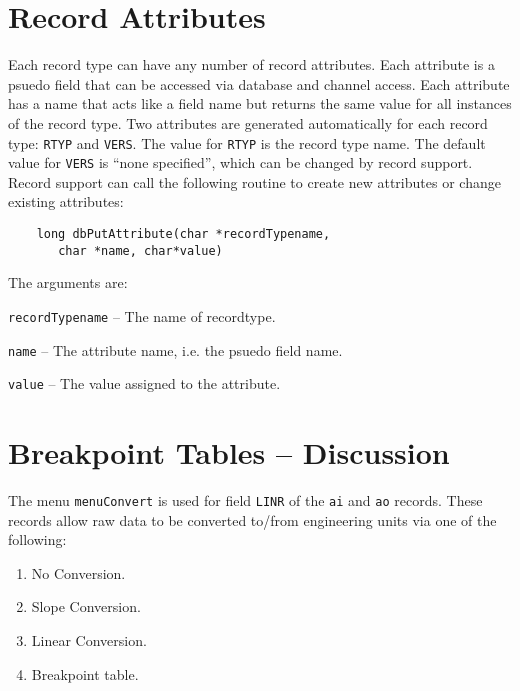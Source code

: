 \section{Record Attributes}

Each record type can have any number of record attributes.
Each attribute is a psuedo field that can be accessed via database and channel access.
Each attribute has a name that acts like a field name but returns the same value for all instances of the record type.
Two attributes are generated automatically for each record type: \verb|RTYP| and \verb|VERS|.
The value for \verb|RTYP| is the record type name.
The default value for \verb|VERS| is ``none specified'', which can be changed by record support.
Record support can call the following routine to create new attributes or change existing attributes:

\begin{verbatim}
    long dbPutAttribute(char *recordTypename,
       char *name, char*value)
\end{verbatim}

The arguments are:

\begin{description}
\item \verb|recordTypename| -- The name of recordtype.
\item \verb|name| -- The attribute name, i.e. the psuedo field name.
\item \verb|value| -- The value assigned to the attribute.
\end{description}

\section{Breakpoint Tables -- Discussion}

The menu \verb|menuConvert| is used for field \verb|LINR| of the \verb|ai| and \verb|ao| records.
These records allow raw data to be converted to/from engineering units via one of the following:

\begin{enumerate}
\item No Conversion.
\item {}Slope Conversion.
\item {}Linear Conversion.
\item Breakpoint table.
\end{enumerate}

